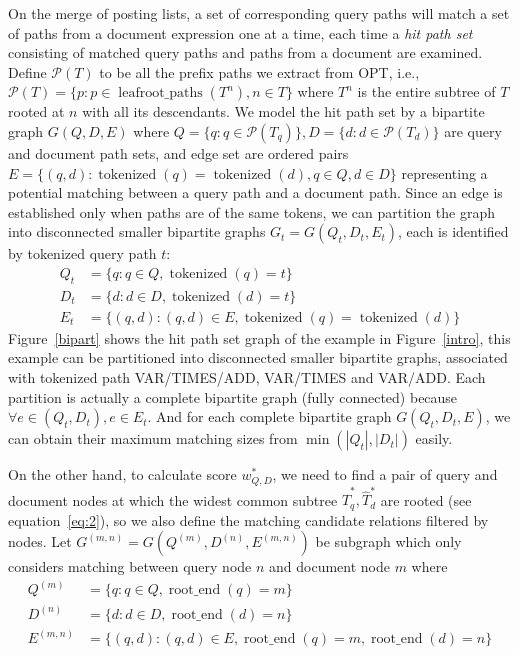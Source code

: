 \documentclass[runningheads]{llncs}
\begin{document}
On the merge of posting lists, a set of corresponding query paths will match a set of paths from a document expression one at a time, each time a \textit{hit path set} consisting of matched query paths and paths from a document are examined.
%
Define $\mathcal{P}(T)$ to be all the prefix paths we extract from OPT, i.e.,
$\mathcal{P}(T) = \{p: p \in \operatorname{leafroot\_paths}(T^n), n \in T\}$ where $T^n$ is the entire subtree of $T$ rooted at $n$ with all its descendants.
%
We model the hit path set by a bipartite graph 
$G(Q, D, E)$ where $Q = \{q: q \in \mathcal{P}(T_q)\}, D = \{d: d \in \mathcal{P}(T_d)\}$ are query and document path sets, and edge set are ordered pairs $E = \{(q, d): \operatorname{tokenized}(q) =  \operatorname{tokenized}(d), q \in Q, d \in D\}$ representing a potential matching between a query path and a document path.
Since an edge is established only when paths are of the same tokens, we can partition the graph into disconnected smaller bipartite graphs $G_t = G(Q_t, D_t, E_t)$, each is identified by tokenized query path $t$:
$$
\begin{aligned}
Q_t &= \{ q: q \in Q, \operatorname{tokenized}(q) = t\} \\
D_t &= \{d: d \in D, \operatorname{tokenized}(d) = t \} \\
E_t &= \{(q, d): (q, d) \in E, \operatorname{tokenized}(q) = \operatorname{tokenized}(d) \}
\end{aligned}
$$
Figure~\ref{bipart} shows the hit path set graph of the example in Figure~\ref{intro}, this example can be partitioned into disconnected smaller bipartite graphs, associated with tokenized path VAR/TIMES/ADD, VAR/TIMES and VAR/ADD.
Each partition is actually a complete bipartite graph (fully connected) because $\forall e \in (Q_t, D_t), e \in E_t$.
And for each complete bipartite graph $G(Q_t, D_t, E)$, we can obtain their maximum matching sizes from $\min(|Q_t|, |D_t|)$ easily.

On the other hand, to calculate score $w^*_{Q, D}$, we need to find a pair of query and document nodes at which the widest common subtree $\hat{T}^*_q, \hat{T}^*_d$ are rooted (see equation~\ref{eq:2}), so we also define the matching candidate relations filtered by nodes.
Let $G^{(m, n)} = G(Q^{(m)}, D^{(n)}, E^{(m, n)})$ be subgraph which only considers matching between query node $n$ and document node $m$  where
$$
\begin{aligned}
Q^{(m)} &= \{ q: q \in Q, \operatorname{root\_end}(q) = m\} \\
D^{(n)} &= \{d: d \in D, \operatorname{root\_end}(d) = n\} \\
E^{(m, n)} &= \{(q, d): (q, d) \in E, \operatorname{root\_end}(q) = m, \operatorname{root\_end}(d) = n\} 
\end{aligned}
$$
\end{document}
